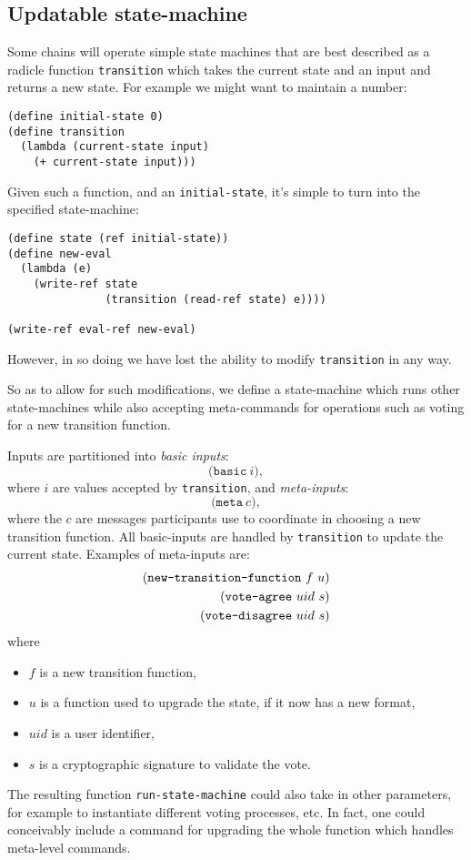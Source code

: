 \subsection{Updatable state-machine}

Some chains will operate simple state machines that are best described as a
radicle function \texttt{transition} which takes the current state and an input
and returns a new state. For example we might want to maintain a number:
\begin{lstlisting}
(define initial-state 0)
(define transition
  (lambda (current-state input)
    (+ current-state input)))
\end{lstlisting}
Given such a function, and an \texttt{initial-state}, it's simple to turn
\rad{} into the specified state-machine:
\begin{lstlisting}
(define state (ref initial-state))
(define new-eval
  (lambda (e)
    (write-ref state
               (transition (read-ref state) e))))

(write-ref eval-ref new-eval)
\end{lstlisting}

However, in so doing we have lost the ability to modify \texttt{transition} in
any way.

So as to allow for such modifications, we define a state-machine which runs other
state-machines while also accepting meta-commands for operations such as voting
for a new transition function.

Inputs are partitioned into \emph{basic inputs}:
\[
\mathtt{(basic} \ i),
\]
where $i$ are values accepted by \texttt{transition}, and \emph{meta-inputs}:
\[
\mathtt{(meta} \ c),
\]
where the $c$ are messages participants use to coordinate in choosing a new
transition function. All basic-inputs are handled by \texttt{transition}
to update the current state. Examples of meta-inputs are:
\begin{align*}
  (\text{\texttt{new-transition-function}} \ f \ u)\\
  (\text{\texttt{vote-agree}} \ uid \ s)\\
  (\text{\texttt{vote-disagree}} \ uid \ s)
\end{align*}
where
\begin{itemize}
\item $f$ is a new transition function,
\item $u$ is a function used to upgrade the state, if it now has a new format,
\item $uid$ is a user identifier,
\item $s$ is a cryptographic signature to validate the vote.
\end{itemize}
The resulting function \texttt{run-state-machine} could also take in other
parameters, for example to instantiate different voting processes, etc. In fact,
one could conceivably include a command for upgrading the whole function which
handles meta-level commands.

